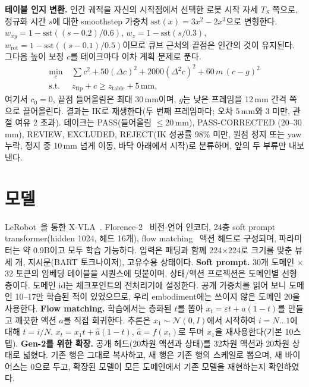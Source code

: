 \documentclass[conference,10pt]{IEEEtran}
\newcommand{\mm}{\,mm\xspace}
\begin{document}
\textbf{테이블 인지 변환.} 인간 궤적을 자신의 시작점에서 선택한 로봇 시작 자세 $T_S$ 쪽으로, 정규화 시간 $s$에 대한 smoothstep
가중치 $\mathrm{sst}(x)=3x^2-2x^3$으로 변형한다. $w_{xy}=1-\mathrm{sst}((s-0.2)/0.6)$, $w_z=1-\mathrm{sst}(s/0.3)$,
$w_\text{rot}=1-\mathrm{sst}((s-0.1)/0.5)$이므로 큐브 근처의 끝점은 인간의 것이 유지된다. 그다음 높이 보정 $c$를 테이크마다 이차
계획 문제로 푼다.
\begin{equation}
\begin{aligned}
\min_c\;& \textstyle\sum c^2+50(\Delta c)^2+2000(\Delta^2 c)^2+60\,m\,(c-g)^2\\
\text{s.t.}\;& z_\text{tip}+c\ge z_\text{table}+5\,\text{mm},
\end{aligned}
\end{equation}
여기서 $c_0=0$, 끝점 들어올림은 최대 30\mm{}이며, $g$는 낮은 프레임을 12\mm{} 간격 쪽으로 끌어올린다. 결과는 IK로 재생한다(두 번째
프레임마다; 오차 5\mm{}와 3\textdegree{} 미만, 관절 여유 2\textdegree{} 초과). 테이크는 PASS(들어올림 $\le$20\mm), PASS-CORRECTED
(20--30\mm), REVIEW, EXCLUDED, REJECT(IK 성공률 98\% 미만, 원점 정지 또는 yaw 누락, 정지 중 10\mm{} 넘게 이동, 바닥 아래에서
시작)로 분류하며, 앞의 두 부류만 내보낸다.

\section{모델}\label{sec:model}
LeRobot~\cite{cadene2024lerobot}을 통한 X-VLA~\cite{zheng2025xvla}. Florence-2~\cite{xiao2024florence2} 비전-언어 인코더, 24층
soft prompt transformer(hidden 1024, 헤드 16개), flow matching~\cite{lipman2023flow} 액션 헤드로 구성되며, 파라미터는 약 0.9B이고
모두 학습 가능하다. 입력은 패딩과 함께 224$\times$224로 크기를 맞춘 뷰 세 개, 지시문(BART 토크나이저), 고유수용 상태이다.
\textbf{Soft prompt.} 30개 도메인 $\times$ 32 토큰의 임베딩 테이블을 시퀀스에 덧붙이며, 상태/액션 프로젝션은 도메인별 선형층이다.
도메인 id는 체크포인트의 전처리기에 설정한다. 공개 가중치를 읽어 보니 도메인 10--17만 학습된 적이 있었으므로, 우리 embodiment에는
쓰이지 않은 도메인 20을 사용한다. \textbf{Flow matching.} 학습에서는 층화된 $t$를 뽑아 $x_t=\varepsilon t+a(1-t)$를 만들고 깨끗한
액션 $a$를 직접 회귀한다. 추론은 $x_1\sim\mathcal N(0,I)$에서 시작하여 $i=N\dots1$에 대해 $t=i/N$, $x_t=x_1 t+\hat a(1-t)$,
$\hat a=f(x_t)$로 두며 $x_1$을 재사용한다(기본 10스텝). \textbf{Gen-2를 위한 확장.} 공개 헤드(20차원 액션과 상태)를 32차원 액션과
20차원 상태로 넓혔다. 기존 행은 그대로 복사하고, 새 행은 기존 행의 스케일로 뽑으며, 새 바이어스는 0으로 두고, 확장된 모델이 모든
도메인에서 기존 모델을 재현하는지 확인하였다.
\end{document}
